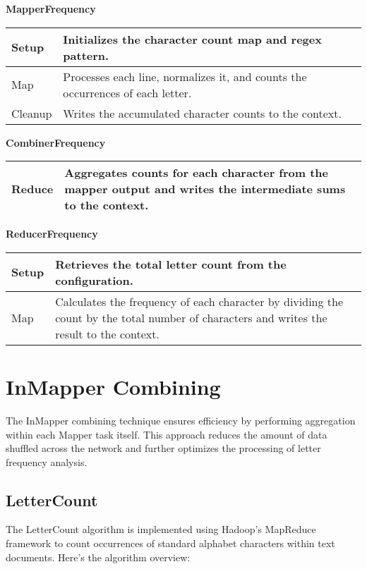 \textbf{MapperFrequency}
\begin{longtable}{|>{\raggedright\arraybackslash}p{}|>{\raggedright\arraybackslash}p{}|}
    \hline
    Setup &   Initializes the character count map and regex pattern.\\
    \hline
    Map &  Processes each line, normalizes it, and counts the occurrences of each letter.\\
    \hline
    Cleanup & Writes the accumulated character counts to the context.\\
    \hline
\end{longtable}


\textbf{CombinerFrequency}
\begin{longtable}{|>{\raggedright\arraybackslash}p{}|>{\raggedright\arraybackslash}p{}|}
    \hline
    Reduce & Aggregates counts for each character from the mapper output and writes the intermediate sums to the context.\\
    \hline
\end{longtable}

\textbf{ReducerFrequency}
\begin{longtable}{|>{\raggedright\arraybackslash}p{}|>{\raggedright\arraybackslash}p{}|}
    \hline
    Setup & Retrieves the total letter count from the configuration. \\
    \hline
    Map & Calculates the frequency of each character by dividing the count by the total number of characters and writes the result to the context.\\
    \hline
\end{longtable}



\section{InMapper Combining}
The InMapper combining technique ensures efficiency by performing aggregation within each Mapper task itself. This approach reduces the amount of data shuffled across the network and further optimizes the processing of letter frequency analysis.


\subsection{LetterCount}

The LetterCount algorithm is implemented using Hadoop's MapReduce framework to count occurrences of standard alphabet characters within text documents. Here’s the algorithm overview:


